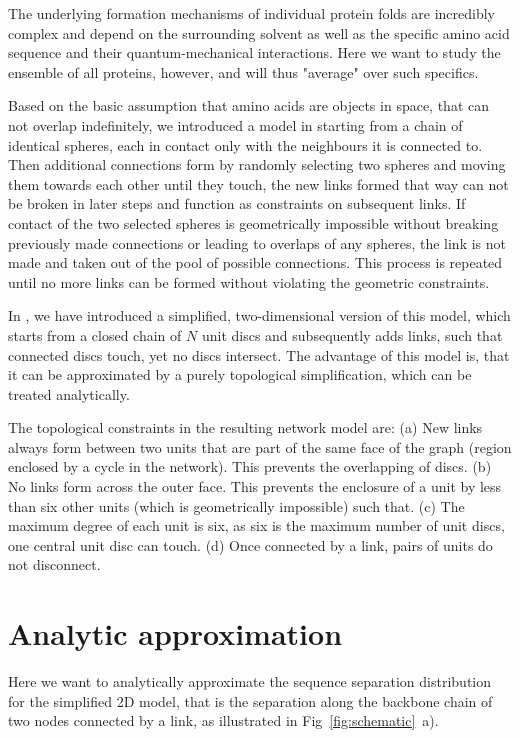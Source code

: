 \documentclass[
reprint,
twocolumn,
amsmath,amssymb,superscriptaddress,aps,
pre]{revtex4-1}
\begin{document}
The underlying formation mechanisms of individual protein folds are incredibly complex and depend on the surrounding solvent as well as the specific amino acid sequence and their quantum-mechanical interactions. Here we want to study the ensemble of all proteins, however, and will thus "average" over such specifics.

Based on the basic assumption that amino acids are objects in space, that can not overlap indefinitely, we introduced a model in \cite{molkenthin2020self} starting from a chain of identical spheres, each in contact only with the neighbours it is connected to. Then additional connections form by randomly selecting two spheres and moving them towards each other until they touch, the new links formed that way can not be broken in later steps and function as constraints on subsequent links. If contact of the two selected spheres is geometrically impossible without breaking previously made connections or leading to overlaps of any spheres, the link is not made and taken out of the pool of possible connections. This process is repeated until no more links can be formed without violating the geometric constraints.

In \cite{molkenthin2016scaling}, we have introduced a simplified, two-dimensional version of this model, which starts from a closed chain of $N$ unit discs and subsequently adds links, such that connected discs touch, yet no discs intersect. The advantage of this model is, that it can be approximated by a purely topological simplification, which can be treated analytically.

The topological constraints in the resulting network model are:
(a) New links always form between two units that are part of the same face of the graph (region enclosed by a cycle in the network). This prevents the overlapping of discs. (b) No links form across the outer face. This prevents the enclosure of a unit by less than six other units (which is geometrically impossible) such that. (c) The maximum degree of each unit is six, as six is the maximum number of unit discs, one central unit disc can touch. (d) Once connected by a link, pairs of units do not disconnect.

\section*{Analytic approximation}
Here we want to analytically approximate the sequence separation distribution for the simplified 2D model, that is the separation along the backbone chain of two nodes connected by a link, as illustrated in Fig~\ref{fig:schematic}~a).
\end{document}

